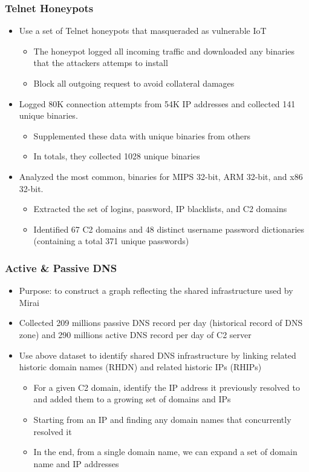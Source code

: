 \documentclass{beamer}
\begin{document}
\begin{frame}
	\frametitle{Telnet Honeypots}
	\begin{itemize}
		\item Use a set of Telnet honeypots that masqueraded as vulnerable IoT
		\begin{itemize}
			\item The honeypot logged all incoming traffic and downloaded any binaries that the attackers attemps to install
			\item Block all outgoing request to avoid collateral damages
		\end{itemize}
		\item Logged 80K connection attempts from 54K IP addresses and collected 141 unique binaries.
		\begin{itemize}
			\item Supplemented these data with unique binaries from others
			\item In totals, they collected 1028 unique binaries
		\end{itemize}
		\item Analyzed the most common, binaries for MIPS 32-bit, ARM 32-bit, and x86 32-bit.
		\begin{itemize}
			\item Extracted the set of logins, password, IP blacklists, and C2 domains
			\item Identified 67 C2 domains and 48 distinct username password dictionaries (containing a total 371 unique passwords)
		\end{itemize}
	\end{itemize}
\end{frame}

\begin{frame}
	\frametitle{Active \& Passive DNS}
	\begin{itemize}
		\item Purpose: to construct a graph reflecting the shared infrastructure used by Mirai
		\item Collected 209 millions passive DNS record per day (historical record of DNS zone) and 290 millions active DNS record per day of C2 server
		\item Use above dataset to identify shared DNS infrastructure by linking related historic domain names (RHDN) and related historic IPs (RHIPs)
		\begin{itemize}
			\item For a given C2 domain, identify the IP address it previously resolved to and added them to a growing set of domains and IPs
			\item Starting from an IP and finding any domain names that concurrently resolved it
			\item In the end, from a single domain name, we can expand a set of domain name and IP addresses
		\end{itemize}
	\end{itemize}
\end{frame}
\end{document}
